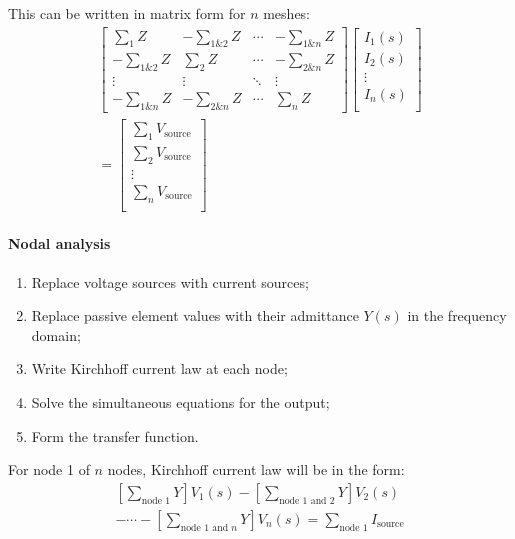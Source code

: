 \documentclass[10pt, twocolumn]{article}
\begin{document}
This can be written in matrix form for \(n\) meshes:
\begin{multline*}
  \begin{bmatrix}
    \sum_1 {Z}       & - \sum_{1\&2}{Z} & \cdots & - \sum_{1\&n}{Z} \\
    - \sum_{1\&2}{Z} & \sum_2 {Z}       & \cdots & - \sum_{2\&n}{Z} \\
    \vdots           & \vdots           & \ddots & \vdots           \\
    - \sum_{1\&n}{Z} & -\sum_{2\&n}{Z}  & \cdots & \sum_n{Z}
  \end{bmatrix}
  \begin{bmatrix}
    I_1(s) \\
    I_2(s) \\
    \vdots \\
    I_n(s) \\
  \end{bmatrix} \\
  =
  \begin{bmatrix}
    \sum_1{V_\text{source}} \\
    \sum_2{V_\text{source}} \\
    \vdots                  \\
    \sum_n{V_\text{source}} \\
  \end{bmatrix}
\end{multline*}


\paragraph{Nodal analysis}
\begin{enumerate}
  \item Replace voltage sources with current sources;
  \item Replace passive element values with their admittance \(Y(s)\) in the frequency domain;
  \item Write Kirchhoff current law at each node;
  \item Solve the simultaneous equations for the output;
  \item Form the transfer function.
\end{enumerate}

For node 1 of \(n\) nodes, Kirchhoff current law will be in the form:
\begin{multline*}
  \left[ \sum_\text{node 1}{Y} \right] V_1(s) - \left[ \sum_\text{node 1 and 2}{Y} \right] V_2(s)\\
  - \cdots - \left[ \sum_{\text{node 1 and } n}{Y} \right] V_n(s) = \sum_\text{node 1}{I_\text{source}}
\end{multline*}
\end{document}
